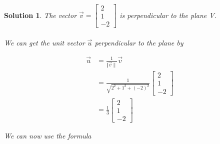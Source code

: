 \documentclass{article}
\newtheorem*{solution}{Solution}
\begin{document}
\begin{solution}
The vector $\vec{v} = \begin{bmatrix} 2 \\ 1 \\ -2 \end{bmatrix}$ is perpendicular to the plane V. 
\\
\\
We can get the unit vector $\vec{u}$ perpendicular to the plane by

\begin{align*}
\displaystyle \vec{u} &= \frac{1}{\Vert \vec{v} \rVert} \vec{v} \\
&= \displaystyle \frac{1}{\sqrt{2^2 + 1^2 + (-2)^2}} \begin{bmatrix} 2 \\ 1 \\ -2 \end{bmatrix} \\
&= \displaystyle \frac{1}{3} \begin{bmatrix} 2 \\ 1 \\ -2 \end{bmatrix} 
\end{align*}

We can now use the formula


\end{solution}
\end{document}
